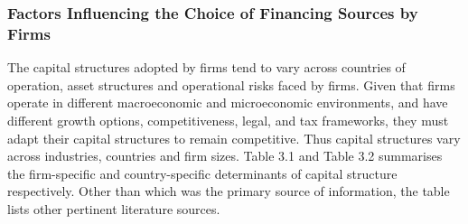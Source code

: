 \documentclass[a4paper,nobind]{templates/ociamthesis}
\begin{document}
\hypertarget{factors-influencing-the-choice-of-financing-sources-by-firms}{%
\subsubsection{Factors Influencing the Choice of Financing Sources by Firms}\label{factors-influencing-the-choice-of-financing-sources-by-firms}}

The capital structures adopted by firms tend to vary across countries of operation, asset structures and operational risks faced by firms. Given that firms operate in different macroeconomic and microeconomic environments, and have different growth options, competitiveness, legal, and tax frameworks, they must adapt their capital structures to remain competitive. Thus capital structures vary across industries, countries and firm sizes. Table 3.1 and Table 3.2 summarises the firm-specific and country-specific determinants of capital structure respectively. Other than \textcite{moyo2013modelling} which was the primary source of information, the table lists other pertinent literature sources.
\end{document}
